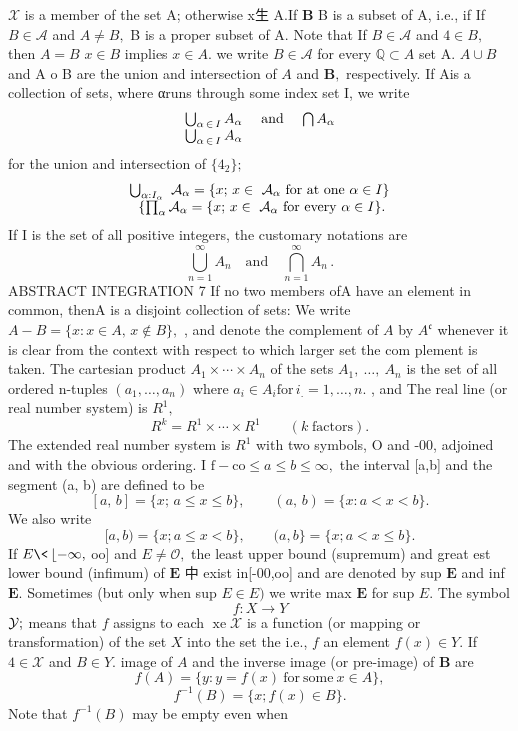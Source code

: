 $\scriptstyle{\mathcal{X}}$ is a member of the set A; otherwise x生 A.If $\boldsymbol{B}$ B is a subset of A, i.e., if If $\scriptstyle B\in{\mathcal{A}}$ and $A\neq B,$ B is a proper subset of A. Note that If $\scriptstyle B\in{\mathcal{A}}$ and $4\in B,$ then $\scriptstyle A=B$ $x\in B$ implies $x\in A.$ we write $\scriptstyle B\in{\mathcal{A}}$ for every $\mathbb{Q}\subset A$ set A. $A\cup B$ and A o B are the union and intersection of $\scriptstyle A$ and ${\boldsymbol{B}},$ respectively. If {A}is a collection of sets, where αruns through some index set I, we write $$ \begin{array}{c c c}{{\bigcup_{\alpha\,\in\,I}A_{\alpha}}}&{{\mathrm{~and~}}}&{{\bigcap A_{\alpha}}}\\ {{\bigcup_{\alpha\,\in\,I}A_{\alpha}}}&{{}}\end{array} $$ for the union and intersection of $\{4_{2}\};$ $$ \begin{array}{c}{{\bigcup_{\alpha:I_{\alpha}}\ {\cal A}_{\alpha}=\{x;\,x\in\ {\cal A}_{\alpha}{\mathrm{~for~at~one~}}\alpha\in I\}}}\\ {{\ \{\prod_{\alpha}{\cal A}_{\alpha}=\{x;\,x\in\ {\cal A}_{\alpha}{\mathrm{~for~every~}}\alpha\in I\}.}}\end{array} $$ If I is the set of all positive integers, the customary notations are $$ \bigcup_{n=1}^{\infty}A_{n}\quad{\mathrm{and}}\quad\bigcap_{n=1}^{\infty}A_{n}\,. $$ABSTRACT INTEGRATION 7 If no two members of{A} have an element in common, then{A} is a disjoint collection of sets: We write $A-B=\{x\colon x\in A,\,x\notin B\},$ , and denote the complement of $\scriptstyle A$ by $A^{\mathfrak{c}}$ whenever it is clear from the context with respect to which larger set the com plement is taken. The cartesian product $A_{1}\times\cdots\times A_{n}$ of the sets $A_{1},\ \ldots,\ A_{n}$ is the set of all ordered n-tuples $(a_{1},\ldots,a_{n})$ where $a_{i}\in A_{i}\mathrm{for}\,i_{.}=1,\ldots,n.$ , and The real line (or real number system) is $\textstyle R^{1},$ $$ R^{k}=R^{1}\times\cdots\times R^{1}\qquad(k\;\mathrm{factors}). $$ The extended real number system is $R^{1}$ with two symbols, O and -00, adjoined and with the obvious ordering. I $\mathrm{f-co}\leq a\leq b\leq\infty,$ the interval [a,b] and the segment (a, b) are defined to be $$ [a,\,b]=\{x;\,a\leq x\leq b\},\qquad(a,\,b)=\{x:a<x<b\}. $$ We also write $$ [a,b)=\{x;a\leq x<b\},\qquad(a,b\}=\{x;a<x\leq b\}. $$ If $E\<\,\lfloor-\infty,$ oo] and $E\neq{\mathcal{O}},$ the least upper bound (supremum) and great est lower bound (infimum) of $\boldsymbol{E}$ 中 exist in[-00,oo] and are denoted by sup $\boldsymbol{E}$ and inf ${\boldsymbol{E}}.$ Sometimes (but only when sup $E\in E)$ we write max $\boldsymbol{E}$ for sup $\textstyle E.$ The symbol $$ f\colon X\to Y $$ ${\cal{Y}};$ means that $\boldsymbol{\mathit{f}}$ assigns to each $\operatorname{xe}{\mathcal{X}}$ is a function (or mapping or transformation) of the set $X$ into the set the i.e., $\boldsymbol{\mathit{f}}$ an element $f(x)\in Y.$ If $4\in{\mathcal{X}}$ and $\scriptstyle B\in Y.$ image of $\scriptstyle A$ and the inverse image (or pre-image) of $\boldsymbol{B}$ are $$ f(A)=\{y\colon y=f(x){\mathrm{~for~some~}}x\in A\}, $$ $$ f^{-1}(B)=\{x;f(x)\in B\}. $$ Note that $f^{-1}(B)$ may be empty even when 